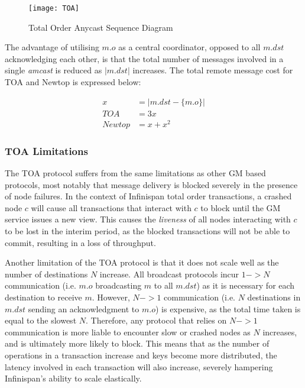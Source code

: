             \begin{figure}[htbp!] 
                \centering    
                \texttt{[image: TOA]}
                \caption[Total Order Anycast Protocol]{Total Order Anycast Sequence Diagram}
                \label{fig:TOA}
            \end{figure}	 			
			
			The advantage of utilising $m.o$ as a central coordinator, opposed to all $m.dst$ acknowledging each other, is that the total number of messages involved in a single \emph{amcast} is reduced as $\left\vert m.dst \right\vert$ increases.  The total remote message cost for TOA and Newtop is expressed below:
			
			\begin{equation*}
		     \begin{aligned}
		       x &= \left\vert m.dst-\{m.o\} \right\vert \\
		       TOA & = 3x \\
		       Newtop & = x + x^2
		     \end{aligned}
		    \end{equation*}

	        \subsubsection*{TOA Limitations}
			The TOA protocol suffers from the same limitations as other GM based protocols, most notably that message delivery is blocked severely in the presence of node failures.  In the context of Infinispan total order transactions, a crashed node $c$ will cause all transactions that interact with $c$ to block until the GM service issues a new view.  This causes the \emph{liveness} of all nodes interacting with $c$ to be lost in the interim period, as the blocked transactions will not be able to commit, resulting in a loss of throughput.  
	        
	        Another limitation of the TOA protocol is that it does not scale well as the number of destinations $N$ increase.  All broadcast protocols incur $1->N$ communication (i.e. $m.o$ broadcasting $m$ to all $m.dst$) as it is necessary for each destination to receive $m$.  However, $N->1$ communication (i.e. $N$ destinations in $m.dst$ sending an acknowledgment to $m.o$) is expensive, as the total time taken is equal to the slowest $N$.  Therefore, any protocol that relies on $N->1$ communication is more liable to encounter slow or crashed nodes as $N$ increases, and is ultimately more likely to block.  This means that as the number of operations in a transaction increase and keys become more distributed, the latency involved in each transaction will also increase, severely hampering Infinispan's ability to scale elastically.  
	        


